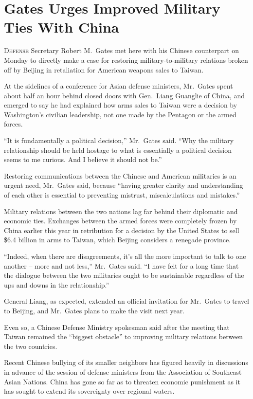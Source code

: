 ﻿\documentclass[12pt]{article}
\begin{document}
\section{Gates Urges Improved Military Ties With China}

\lettrine{D}{efense} Secretary Robert M.~Gates met here with his Chinese
counterpart on Monday to directly make a case for restoring military-to-military relations broken
off by Beijing in retaliation for American weapons sales to Taiwan.

At the sidelines of a conference for Asian defense ministers, Mr.~Gates spent about half an hour
behind closed doors with Gen.~Liang Guanglie of China, and emerged to say he had explained how arms
sales to Taiwan were a decision by Washington's civilian leadership, not one made by the Pentagon or
the armed forces.

``It is fundamentally a political decision,'' Mr.~Gates said. ``Why the military relationship should
be held hostage to what is essentially a political decision seems to me curious. And I believe it
should not be.''

Restoring communications between the Chinese and American militaries is an urgent need, Mr.~Gates
said, because ``having greater clarity and understanding of each other is essential to preventing
mistrust, miscalculations and mistakes.''

Military relations between the two nations lag far behind their diplomatic and economic ties.
Exchanges between the armed forces were completely frozen by China earlier this year in retribution
for a decision by the United States to sell \$6.4 billion in arms to Taiwan, which Beijing considers
a renegade province.

``Indeed, when there are disagreements, it's all the more important to talk to one another -- more
and not less,'' Mr.~Gates said. ``I have felt for a long time that the dialogue between the two
militaries ought to be sustainable regardless of the ups and downs in the relationship.''

General Liang, as expected, extended an official invitation for Mr.~Gates to travel to Beijing, and
Mr.~Gates plans to make the visit next year.

Even so, a Chinese Defense Ministry spokesman said after the meeting that Taiwan remained the
``biggest obstacle'' to improving military relations between the two countries.

Recent Chinese bullying of its smaller neighbors has figured heavily in discussions in advance of
the session of defense ministers from the Association of Southeast Asian Nations. China has gone so
far as to threaten economic punishment as it has sought to extend its sovereignty over regional
waters.
\end{document}
